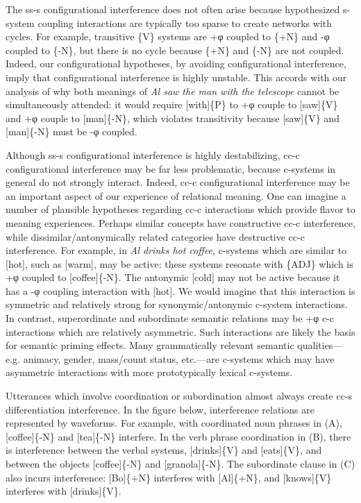   The ss-s configurational interference does not often arise because hypothesized s-system coupling interactions are typically too sparse to create networks with cycles. For example, transitive \{V\} systems are +φ coupled to \{+N\} and -φ coupled to \{-N\}, but there is no cycle because \{+N\} and \{-N\} are not coupled. Indeed, our configurational hypotheses, by avoiding configurational interference, imply that configurational interference is highly unstable. This accords with our analysis of why both meanings of \textit{Al saw the man with the telescope} cannot be simultaneously attended: it would require [with]\{P\} to +φ couple to [saw]\{V\} and +φ couple to [man]\{-N\}, which violates transitivity because [saw]\{V\} and [man]\{-N\} must be -φ coupled. 

  Although ss-s configurational interference is highly destabilizing, cc-c configurational interference may be far less problematic, because c-systems in general do not strongly interact. Indeed, cc-c configurational interference may be an important aspect of our experience of relational meaning. One can imagine a number of plausible hypotheses regarding cc-c interactions which provide flavor to meaning experiences. Perhaps similar concepts have constructive cc-c interference, while dissimilar/antonymically related categories have destructive cc-c interference. For example, in \textit{Al drinks hot coffee}, c-systems which are similar to [hot], such as [warm], may be active: these systems resonate with \{\textsc{ADJ}\} which is +φ coupled to [coffee]\{-N\}. The antonymic [cold] may not be active because it has a -φ coupling interaction with [hot]. We would imagine that this interaction is symmetric and relatively strong for synonymic/antonymic c-system interactions. In contrast, superordinate and subordinate semantic relations may be +φ c-c interactions which are relatively asymmetric. Such interactions are likely the basis for semantic priming effects. Many grammatically relevant semantic qualities—e.g. animacy, gender, mass/count status, etc.—are c-systems which may have asymmetric interactions with more prototypically lexical c-systems.

  Utterances which involve coordination or subordination almost always create cc-s differentiation interference. In the figure below, interference relations are represented by waveforms. For example, with coordinated noun phrases in (A), [coffee]\{-N\} and [tea]\{-N\} interfere. In the verb phrase coordination in (B), there is interference between the verbal systems, [drinks]\{V\} and [eats]\{V\}, and between the objects [coffee]\{-N\} and [granola]\{-N\}. The subordinate clause in (C) also incurs interference: [Bo]\{+N\} interferes with [Al]\{+N\}, and [knows]\{V\} interferes with [drinks]\{V\}.


